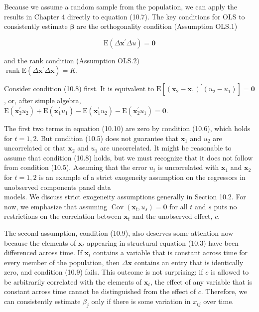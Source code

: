 \documentclass[10pt]{article}
\begin{document}
Because we assume a random sample from the population, we can apply the results in Chapter 4 directly to equation (10.7). The key conditions for OLS to consistently estimate $\boldsymbol{\beta}$ are the orthogonality condition (Assumption OLS.1)


\begin{equation*}
\mathrm{E}\left(\Delta \mathbf{x}^{\prime} \Delta u\right)=\mathbf{0} \tag{10.8}
\end{equation*}


and the rank condition (Assumption OLS.2)\\
$\operatorname{rank} \mathrm{E}\left(\Delta \mathbf{x}^{\prime} \Delta \mathbf{x}\right)=K$.

Consider condition (10.8) first. It is equivalent to $\mathrm{E}\left[\left(\mathbf{x}_{2}-\mathbf{x}_{1}\right)^{\prime}\left(u_{2}-u_{1}\right)\right]=\mathbf{0}$, or, after simple algebra,\\
$\mathrm{E}\left(\mathbf{x}_{2}^{\prime} u_{2}\right)+\mathrm{E}\left(\mathbf{x}_{1}^{\prime} u_{1}\right)-\mathrm{E}\left(\mathbf{x}_{1}^{\prime} u_{2}\right)-\mathrm{E}\left(\mathbf{x}_{2}^{\prime} u_{1}\right)=\mathbf{0}$.

The first two terms in equation (10.10) are zero by condition (10.6), which holds for $t=1,2$. But condition (10.5) does not guarantee that $\mathbf{x}_{1}$ and $u_{2}$ are uncorrelated or that $\mathbf{x}_{2}$ and $u_{1}$ are uncorrelated. It might be reasonable to assume that condition (10.8) holds, but we must recognize that it does not follow from condition (10.5). Assuming that the error $u_{t}$ is uncorrelated with $\mathbf{x}_{1}$ and $\mathbf{x}_{2}$ for $t=1,2$ is an example of a strict exogeneity assumption on the regressors in unobserved components panel data\\
models. We discuss strict exogeneity assumptions generally in Section 10.2. For now, we emphasize that assuming $\operatorname{Cov}\left(\mathbf{x}_{t}, u_{s}\right)=\mathbf{0}$ for all $t$ and $s$ puts no restrictions on the correlation between $\mathbf{x}_{t}$ and the unobserved effect, $c$.

The second assumption, condition (10.9), also deserves some attention now because the elements of $\mathbf{x}_{t}$ appearing in structural equation (10.3) have been differenced across time. If $\mathbf{x}_{t}$ contains a variable that is constant across time for every member of the population, then $\Delta \mathbf{x}$ contains an entry that is identically zero, and condition (10.9) fails. This outcome is not surprising: if $c$ is allowed to be arbitrarily correlated with the elements of $\mathbf{x}_{t}$, the effect of any variable that is constant across time cannot be distinguished from the effect of $c$. Therefore, we can consistently estimate $\beta_{j}$ only if there is some variation in $x_{t j}$ over time.
\end{document}
